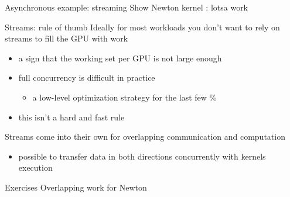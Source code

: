 \begin{frame}[fragile]{Asynchronous example: streaming}
    Show Newton kernel : lotsa work
\end{frame}

\begin{frame}[fragile]{Streams: rule of thumb}
    Ideally for most workloads you don't want to rely on streams to fill the GPU with work
    \begin{itemize}
        \item a sign that the working set per GPU is not large enough
        \item full concurrency is difficult in practice
        \begin{itemize}
            \item a low-level optimization strategy for the last few \%
        \end{itemize}
        \item this isn't a hard and fast rule
    \end{itemize}

    Streams come into their own for overlapping communication and computation
    \begin{itemize}
        \item possible to transfer data in both directions concurrently with kernels execution
    \end{itemize}
\end{frame}


\begin{frame}[fragile]{Exercises}
    Overlapping work for Newton
\end{frame}
